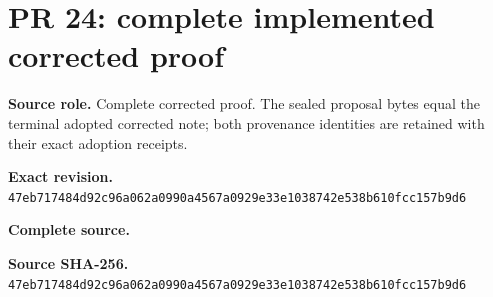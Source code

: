 \begingroup
\sloppy
\small
\section{PR 24: complete implemented corrected proof}
\noindent\textbf{Source role.} Complete corrected proof. The sealed proposal bytes equal the terminal adopted corrected note; both provenance identities are retained with their exact adoption receipts.\par
\noindent\textbf{Exact revision.} \nolinkurl{47eb717484d92c96a062a0990a4567a0929e33e1038742e538b610fcc157b9d6}\par
\noindent\textbf{Complete source.} \par
\noindent\textbf{Source SHA-256.} \nolinkurl{47eb717484d92c96a062a0990a4567a0929e33e1038742e538b610fcc157b9d6}\par\medskip

\endgroup
